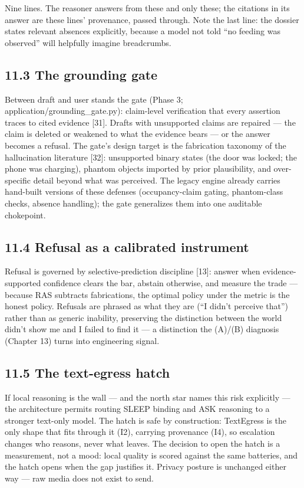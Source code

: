Nine lines. The reasoner answers from these and only these; the citations in its answer are these lines' provenance, passed through. Note the last line: the dossier states relevant absences explicitly, because a model not told ``no feeding was observed'' will helpfully imagine breadcrumbs.

\subsection{11.3 The grounding gate}\label{the-grounding-gate}

Between draft and user stands the gate (Phase 3; application/grounding\_gate.py): claim-level verification that every assertion traces to cited evidence {[}31{]}. Drafts with unsupported claims are repaired --- the claim is deleted or weakened to what the evidence bears --- or the answer becomes a refusal. The gate's design target is the fabrication taxonomy of the hallucination literature {[}32{]}: unsupported binary states (the door was locked; the phone was charging), phantom objects imported by prior plausibility, and over-specific detail beyond what was perceived. The legacy engine already carries hand-built versions of these defenses (occupancy-claim gating, phantom-class checks, absence handling); the gate generalizes them into one auditable chokepoint.

\subsection{11.4 Refusal as a calibrated instrument}\label{refusal-as-a-calibrated-instrument}

Refusal is governed by selective-prediction discipline {[}13{]}: answer when evidence-supported confidence clears the bar, abstain otherwise, and measure the trade --- because RAS subtracts fabrications, the optimal policy under the metric is the honest policy. Refusals are phrased as what they are (``I didn't perceive that'') rather than as generic inability, preserving the distinction between the world didn't show me and I failed to find it --- a distinction the (A)/(B) diagnosis (Chapter 13) turns into engineering signal.

\subsection{11.5 The text-egress hatch}\label{the-text-egress-hatch}

If local reasoning is the wall --- and the north star names this risk explicitly --- the architecture permits routing SLEEP binding and ASK reasoning to a stronger text-only model. The hatch is safe by construction: TextEgress is the only shape that fits through it (I2), carrying provenance (I4), so escalation changes who reasons, never what leaves. The decision to open the hatch is a measurement, not a mood: local quality is scored against the same batteries, and the hatch opens when the gap justifies it. Privacy posture is unchanged either way --- raw media does not exist to send.

